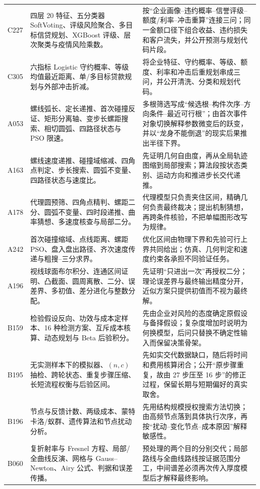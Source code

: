 \begin{longtable}{p{1.4cm}p{5.2cm}p{7.0cm}}
C227 & 四层 20 特征、五分类器 SoftVoting、评级风险聚合、多目标信贷规划、XGBoost 评级、层次聚类与疫情风险乘数。 &
按“企业画像--违约概率--信誉评级--额度/利率--冲击重算”连接三问；同一金额口径下组合收益、违约损失和客户流失，并公开预测与规划代码片段。\\
C305 & 六指标 Logistic 守约概率、等级均值最近距离、单/多目标贷款规划与外部冲击折减。 &
将企业特征、守约概率、等级、额度、利率和冲击后重规划串成三问，并公开清洗、分类和规划代码。\\
A053 & 螺线弧长、定长递推、首次碰撞反证、矩形分离轴、变步长螺距搜索、相切圆弧、四路径状态与 PSO 限速。 &
多根筛选写成“候选根--构件次序--方向条件--最近可行根”；由首次事件对象切换解释参数微变后的跃变，并以“龙身不能倒退”的现实后果推出半径下界。\\
A163 & 螺线速度递推、碰撞域缩减、四角点判定、步长搜索、圆弧不变量、四路径状态与速度比。 &
先证明几何自由度，再从全局轨迹图缩到局部搜索；算法段按状态类别、运动方向和推进步长交代递推。\\
A178 & 代理圆预筛、四角点精判、螺距二分、圆弧不变量、四时段递推、曲率猜想、多速度核查与局部二分。 &
代理模型只负责夹住区间，精确几何负责最终裁决；提出机制猜想，再跨条件核验，不把单幅图形改写为规律。\\
A242 & 首次碰撞缩域、点线距离、螺距 PSO、盘入盘出路径、齐次速度传递与粗搜--三分求界。 &
优化区间由物理下界和先验可行上界共同给出；仿真、几何判定和速度约束各承担不同验证任务。\\
A196 & 视线球面布尔积分、连通区间证明、凸截面、圆周离散、二分、误差界、多初值、差分进化与整数分配。 &
先证明“只进出一次”再授权二分；理论误差界与最终输出精度分开，近似方案只提供初值而不视为最终解。\\
B159 & 检验假设反向、功效与成本定样本、16 种检测方案、互斥成本核算、动态规划与 Beta 后验积分。 &
先由企业对风险的态度确定原假设与备择假设；复杂度增加时说明为何换模型，后问只替换不确定性输入而保留决策骨架。\\
B195 & 无实测样本下的模拟器、$(n,c)$ 抽检、跨轮状态、重复步骤压缩、长短流程权衡与后验区间。 &
先如实交代数据缺口，随后将时间和费用核算闭合；公开“原步骤重复，故由 27 步压至 16 步”的修正过程，保留长期与短期偏好的真实取舍。\\
B196 & 节点与反馈计数、两级成本、蒙特卡洛/蚁群、遗传算法和节点扰动分析。 &
先用结构规模授权搜索方法切换；由高频节点落到具体执行次序，再按“扰动--变化节点--成本原因”解释敏感性。\\
B060 & 复折射率与 Fresnel 方程、局部/全曲线反演、网格与 Gauss--Newton、Airy 公式、判据和误差传播。 &
预处理的两个目的分别交代；局部路线与全曲线路线按证据范围分工，中间谱差必须再次传入厚度模型后才解释最终影响。\\

\end{longtable}
